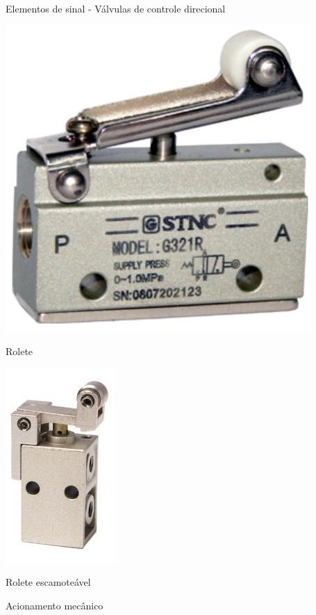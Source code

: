 \begin{frame}{Elementos de sinal - Válvulas de controle direcional}
	\begin{minipage}[c]{0.48\linewidth}
		\centering
		\includegraphics[width=0.9\linewidth]{Figuras/Ch14/fig15}
		
		Rolete
	\end{minipage}
	\hfill
	\begin{minipage}[c]{0.48\linewidth}
		\centering
		\includegraphics[height=0.7\textheight]{Figuras/Ch14/fig16}
		
		Rolete escamoteável
	\end{minipage}

	\centering
	\bigskip
	
	Acionamento mecânico
\end{frame}


